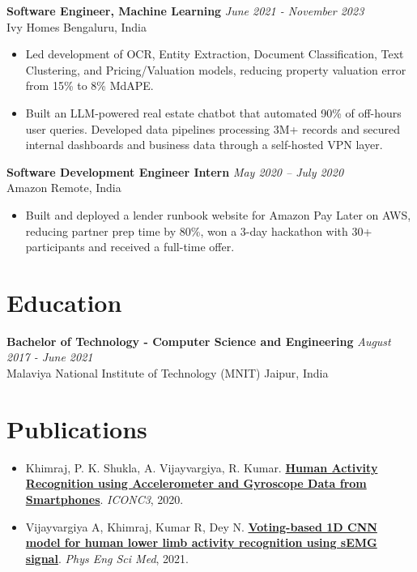 \documentclass[a4paper,20pt]{article}
\begin{document}
    \noindent\textbf{Software Engineer, Machine Learning} \hfill \textit{June 2021 - November 2023}\\
    Ivy Homes \hfill Bengaluru, India
    \vspace{-2pt}
    \begin{itemize}[label=$\bullet$]
        \item Led development of OCR, Entity Extraction, Document Classification, Text Clustering, and Pricing/Valuation models, reducing property valuation error from 15\% to 8\% MdAPE.
        \vspace{-4pt}
        \item Built an LLM-powered real estate chatbot that automated 90\% of off-hours user queries. Developed data pipelines processing 3M+ records and secured internal dashboards and business data through a self-hosted VPN layer.
      \end{itemize}
 
    \noindent\textbf{Software Development Engineer Intern} \hfill \textit{May 2020 -- July 2020}\\
    Amazon \hfill Remote, India
    \vspace{-2pt}
		\begin{itemize}[label=$\bullet$]
        \item Built and deployed a lender runbook website for Amazon Pay Later on AWS, reducing partner prep time by 80\%, won a 3-day hackathon with 30+ participants and received a full-time offer.
		\end{itemize}
 
\vspace{1pt}
\section{Education}
\noindent\textbf{Bachelor of Technology - Computer Science and Engineering} \hfill \textit{August 2017 - June 2021}\\
Malaviya National Institute of Technology (MNIT) \hfill Jaipur, India
 
\vspace{1pt}
\section*{Publications}
\begin{itemize}[leftmargin=*]
    \item Khimraj, P. K. Shukla, A. Vijayvargiya, R. Kumar. \href{https://ieeexplore.ieee.org/document/9117456}{\textbf{Human Activity Recognition using Accelerometer and Gyroscope Data from Smartphones}}. \textit{ICONC3}, 2020.
    \vspace{-4pt}
    \item Vijayvargiya A, Khimraj, Kumar R, Dey N. \href{https://link.springer.com/article/10.1007/s13246-021-01071-6}{\textbf{Voting-based 1D CNN model for human lower limb activity recognition using sEMG signal}}. \textit{Phys Eng Sci Med}, 2021.
\end{itemize}
 
\end{document}
